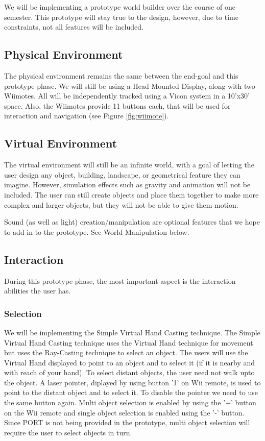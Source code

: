 We will be implementing a prototype world builder over the course of one semester.
This prototype will stay true to the design, however, due to time constraints, not all features will be included.

\subsection{Physical Environment}
The physical environment remains the same between the end-goal and this prototype phase.
We will still be using a Head Mounted Display, along with two Wiimotes.
All will be independently tracked using a Vicon system in a 10'x30' space.
Also, the Wiimotes provide 11 buttons each, that will be used for interaction and navigation (see Figure \ref{fig:wiimote}).

\subsection{Virtual Environment}
The virtual environment will still be an infinite world, with a goal of letting the user design any object, building, landscape, or geometrical feature they can imagine.
However, simulation effects such as gravity and animation will not be included.
The user can still create objects and place them together to make more complex and larger objects, but they will not be able to give them motion.

Sound (as well as light) creation/manipulation are optional features that we hope to add in to the prototype.  See World Manipulation below.

\subsection{Interaction}
During this prototype phase, the most important aspect is the interaction abilities the user has.

\subsubsection{Selection}
We will be implementing the Simple Virtual Hand Casting technique.
The Simple Virtual Hand Casting technique uses the Virtual Hand technique for movement but uses the Ray-Casting technique to select an object. 
The users will use the Virtual Hand displayed to point to an object and to select it (if it is nearby and with reach of your hand). 
To select distant objects, the user need not walk upto the object. 
A laser pointer, diplayed by using button '1' on Wii remote, is used to point to the distant object and to select it. 
To disable the pointer we need to use the same button again.
Multi object selection is enabled by using the '+' button on the Wii remote and single object selection is enabled using the '-' button.
Since PORT is not being provided in the prototype, multi object selection will require the user to select objects in turn. 

